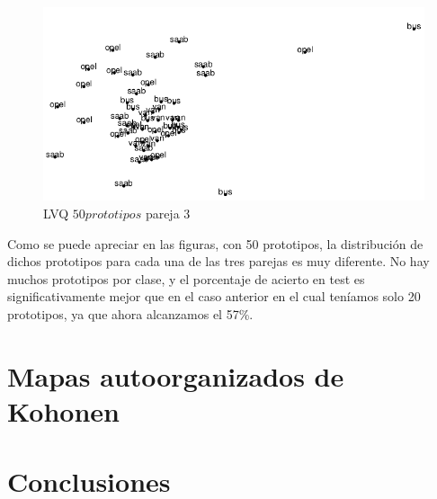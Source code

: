 \documentclass[11pt,spanish,listoffigures,listoftables]{workluis}
\begin{document}
\begin{figure}[H]
\centering
\includegraphics[scale=0.5]{lvq50p3}
\caption{LVQ $50 prototipos$ pareja 3}
\end{figure} 

\par Como se puede apreciar en las figuras, con 50 prototipos, la distribución de dichos prototipos para cada una de las tres parejas es muy diferente. No hay muchos prototipos por clase, y el porcentaje de acierto en test es significativamente mejor que en el caso anterior en el cual teníamos solo 20 prototipos, ya que ahora alcanzamos el 57\%.






\chapter{Mapas autoorganizados de Kohonen}




\chapter{Conclusiones}
\end{document}
